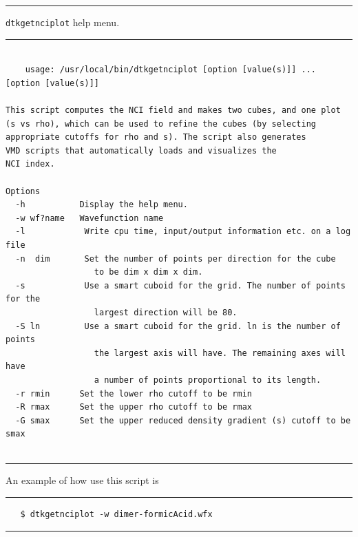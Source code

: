 \rule{\textwidth}{1pt}
{\center\texttt{dtkgetnciplot} help menu.\\}
\rule{\textwidth}{1pt}
\begin{footnotesize}
\begin{verbatim}

    usage: /usr/local/bin/dtkgetnciplot [option [value(s)]] ... [option [value(s)]]

This script computes the NCI field and makes two cubes, and one plot
(s vs rho), which can be used to refine the cubes (by selecting
appropriate cutoffs for rho and s). The script also generates
VMD scripts that automatically loads and visualizes the 
NCI index.

Options 
  -h           Display the help menu.
  -w wf?name   Wavefunction name
  -l        	Write cpu time, input/output information etc. on a log file
  -n  dim   	Set the number of points per direction for the cube
            	  to be dim x dim x dim.
  -s        	Use a smart cuboid for the grid. The number of points for the
            	  largest direction will be 80.
  -S ln     	Use a smart cuboid for the grid. ln is the number of points
            	  the largest axis will have. The remaining axes will have
            	  a number of points proportional to its length.
  -r rmin      Set the lower rho cutoff to be rmin
  -R rmax      Set the upper rho cutoff to be rmax
  -G smax      Set the upper reduced density gradient (s) cutoff to be smax


\end{verbatim}
\end{footnotesize}
\rule{\textwidth}{1pt}

An example of how use this script is 

\rule{\textwidth}{1pt}
\begin{footnotesize}
\begin{verbatim}
   $ dtkgetnciplot -w dimer-formicAcid.wfx
\end{verbatim}
\end{footnotesize}
\rule{\textwidth}{1pt}

